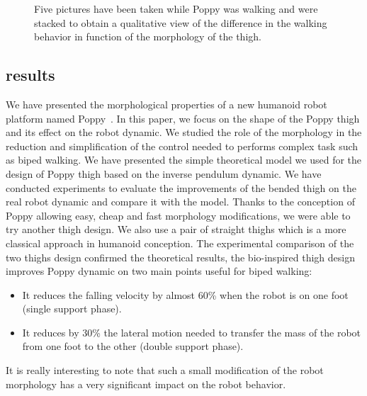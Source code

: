 \begin{figure}
\centering
    \hfil
    \caption{Five pictures have been taken while Poppy was walking and were stacked to obtain a qualitative view of the difference in the walking behavior in function of the morphology of the thigh.}
    \label{fig:poppy_walking_compared}
\end{figure}

\subsection{results} %
\label{sub:results}
We have presented the morphological properties of a new humanoid robot platform named Poppy~\cite{lapeyre2013poppy}.
In this paper, we focus on the shape of the Poppy thigh and its effect on the robot dynamic.
We studied the role of the morphology in the reduction and simplification of the control needed to performs complex task such as biped walking.
We have presented the simple theoretical model we used for the design of Poppy thigh based on the inverse pendulum dynamic.
We have conducted experiments to evaluate the improvements of the bended thigh on the real robot dynamic and compare it with the model.
Thanks to the conception of Poppy allowing easy, cheap and fast morphology modifications, we were able to try another thigh design.
We also use a pair of straight thighs which is a more classical approach in humanoid conception.
The experimental comparison of the two thighs design confirmed the theoretical results, the bio-inspired thigh design improves Poppy dynamic on two main points useful for biped walking:
\begin{itemize}
    \item It reduces the falling velocity by almost 60\% when the robot is on one foot (single support phase).
    \item It reduces by 30\% the lateral motion needed to transfer the mass of the robot from one foot to the other (double support phase).
\end{itemize}
It is really interesting to note that such a small modification of the robot morphology has a very significant impact on the robot behavior.

